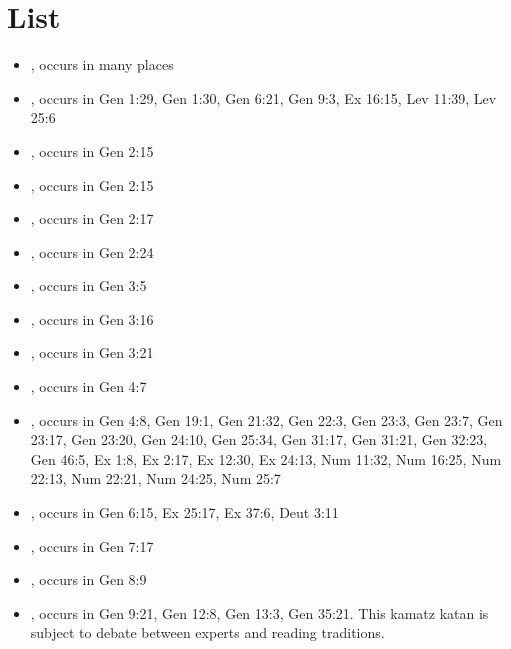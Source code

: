 \documentclass[14pt]{article}
\begin{document}
	

	
\section{List}
	
\begin{itemize} \item {}, occurs in many places

\item {}, occurs in Gen 1:29, Gen 1:30, Gen 6:21, Gen 9:3, Ex 16:15, Lev 11:39, Lev 25:6

\item {}, occurs in Gen 2:15

\item {}, occurs in Gen 2:15

\item {}, occurs in Gen 2:17

\item {}, occurs in Gen 2:24

\item {}, occurs in Gen 3:5

\item {}, occurs in Gen 3:16

\item {}, occurs in Gen 3:21

\item {}, occurs in Gen 4:7

\item {}, occurs in Gen 4:8, Gen 19:1, Gen 21:32, Gen 22:3, Gen 23:3, Gen 23:7, Gen 23:17, Gen 23:20, Gen 24:10, Gen 25:34, Gen 31:17, Gen 31:21, Gen 32:23, Gen 46:5, Ex 1:8, Ex 2:17, Ex 12:30, Ex 24:13, Num 11:32, Num 16:25, Num 22:13, Num 22:21, Num 24:25, Num 25:7

\item {}, occurs in Gen 6:15, Ex 25:17, Ex 37:6, Deut 3:11

\item {}, occurs in Gen 7:17

\item {}, occurs in Gen 8:9

\item {}, occurs in Gen 9:21, Gen 12:8, Gen 13:3, Gen 35:21. This kamatz katan is subject to debate between experts and reading traditions.


\end{itemize}
\end{document}
